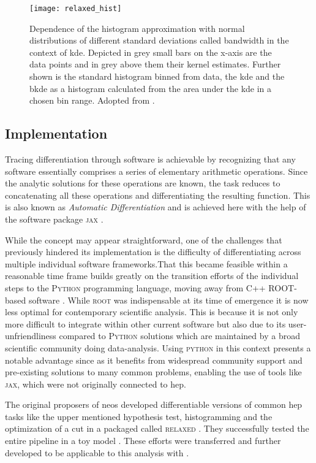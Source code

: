 \begin{figure}
    \centering
    \texttt{[image: relaxed\_hist]}
    \caption[]{Dependence of the histogram approximation with normal distributions of different standard deviations called bandwidth in the context of \ac{kde}. Depicted in grey small bars on the x-axis are the data points and in grey above them their kernel estimates. Further shown is the standard histogram binned from data, the \ac{kde} and the \ac{bkde} as a histogram calculated from the area under the \ac{kde} in a chosen bin range. Adopted from \citep{Simpson_2023}.}
    \label{fig:relaxed_hist}
\end{figure}


\subsection{Implementation}
Tracing differentiation through software is achievable by recognizing that any software essentially comprises a series of elementary arithmetic operations. Since the analytic solutions for these operations are known, the task reduces to concatenating all these operations and differentiating the resulting function. This is also known as \textit{Automatic Differentiation} and is achieved here with the help of the software package \textsc{jax} \citep{jax2018github}.

While the concept may appear straightforward, one of the challenges that previously hindered its implementation is the difficulty of differentiating across multiple individual software frameworks.That this became feasible within a reasonable time frame builds greatly on the transition efforts  of the individual steps to the \textsc{Python} programming language, moving away from C++ \textsc{ROOT}-based software \citep{ANTCHEVA20092499}. While \textsc{root} was indispensable at its time of emergence it is now less optimal for contemporary scientific analysis. This is because it is not only more difficult to integrate within other current software but also due to its user-unfriendliness compared to \textsc{Python} solutions which are maintained by a broad scientific community doing data-analysis. Using \textsc{python} in this context presents a notable advantage since as it benefits from widespread community support and pre-existing solutions to many common problems, enabling the use of tools like \textsc{jax}, which were not originally connected to \ac{hep}.


The original proposers \citet{Simpson_2023} of \ac{neos} developed differentiable versions of common \ac{hep} tasks like the upper mentioned hypothesis test, histogramming and the optimization of a cut in a packaged called \textsc{relaxed} \citep{Simpson_relaxed_version_0_3_0_2023}. They successfully tested the entire pipeline in a toy model \citep{Simpson_neos_version_0_2_0_2021}. These efforts were transferred and further developed to be applicable to this analysis with \citep{hh_neos}. 

